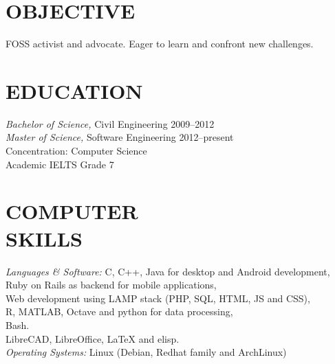 \documentclass[margin, 10pt]{res} %
\begin{document}
\begin{resume}


\section{OBJECTIVE}
FOSS activist and advocate. Eager to learn and confront new challenges.

\section{EDUCATION}

{\sl Bachelor of Science,} Civil Engineering 2009--2012 \\
{\sl Master of Science,} Software Engineering 2012--present\\
Concentration: Computer Science \\
Academic IELTS Grade 7

\section{COMPUTER \\ SKILLS}

{\sl Languages \& Software:}
C, C++, Java for desktop and Android development, \\
Ruby on Rails as backend for mobile applications, \\
Web development using LAMP stack (PHP, SQL, HTML, JS and CSS), \\
R, MATLAB, Octave and python for data processing, \\
Bash. \\
LibreCAD, LibreOffice, LaTeX and elisp. \\
{\sl Operating Systems:} Linux (Debian, Redhat family and ArchLinux)
 
 

\end{resume}
\end{document}
